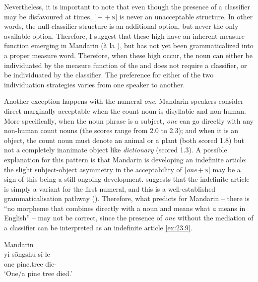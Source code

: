 \documentclass[output=paper]{langsci/langscibook}
\begin{document}
Nevertheless, it is important to note that even though the presence of a
classifier may be disfavoured at times, [\Num{}\,+\,\Clf{}\,+\,\textsc{n}] is never
an unacceptable structure. In other words, the null-classifier structure is an
additional option, but never the only available option. Therefore, I suggest
that these high  have an inherent measure function emerging in
Mandarin (à la \citealt{Krifka1995}), but has not yet been
grammaticalized into a proper measure word. Therefore,
when these high  occur, the noun can either be individuated by
the measure function of the  and does not require a
classifier, or be individuated by the
classifier. The preference for either of the two individuation
strategies varies from one speaker to another.

Another exception happens with the numeral \emph{one}. Mandarin speakers
consider direct  marginally acceptable when the count noun is
disyllabic and non-human. More specifically, when the noun phrase is a subject,
\emph{one} can go directly with any non-human count nouns (the scores range
from 2.0 to 2.3); and when it is an object, the count noun must denote an
animal or a plant (both scored 1.8) but not a completely inanimate object like
\emph{dictionary} (scored 1.3). A possible explanation for this pattern is
that Mandarin is developing an indefinite article: the slight subject-object
asymmetry in the acceptability of [\emph{one}\,+\,\textsc{n}] may be a sign of this being
a still ongoing development. \citet{Chierchia1998} suggests that the indefinite
article is simply a variant for the first numeral, and this is a
well-established grammaticalisation pathway (\citealt{HeineKuteva2002}).
Therefore, what \citeauthor{Chierchia1998} predicts for Mandarin -- there is
“no morpheme that combines directly with a noun and means what \emph{a} means
in English” \parencite[91]{Chierchia1998} -- may not be correct, since the
presence of \emph{one} without the mediation of a classifier
can be interpreted as an indefinite article \eqref{ex:23.9}.

\ea\label{ex:23.9} Mandarin\\
    \gll yì sōngshu sǐ-le\\
    	one pine.tree die-\Pfv{}\\
    \glt `One/a pine tree died.'
\z
\end{document}
